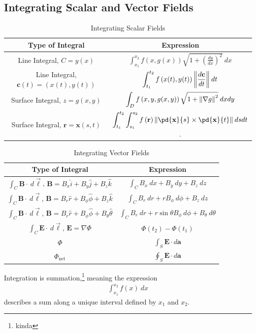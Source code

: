 \documentclass[10pt]{mypackage}
\begin{document}
\subsection{Integrating Scalar and Vector Fields}%
\begin{table}
  \centering
  \renewcommand{\arraystretch}{2.5}
  \begin{tabular}{c|c}
    Type of Integral & Expression\\
    \hline\hline
    Line Integral, $C = y(x)$ & $\displaystyle \int_{x_1}^{x_2} f\left(x,g(x)\right)\sqrt{1 + \left(\frac{dy}{dx}\right)^2}\:dx$\\
    Line Integral, $\mathbf{c}(t) = \left(x(t),y(t)\right)$ & $\displaystyle\int_{t_1}^{t_2}f\left(x(t),y(t)\right)\norm{\frac{d\mathbf{c}}{dt}}\:dt$\\
    \hline
    Surface Integral, $z = g(x,y)$ & $\displaystyle \int_{D}^{} f\left(x,y,g(x,y)\right)\sqrt{1 + \norm{\nabla g}^2}\:dxdy$\\
    Surface Integral, $\mathbf{r} = \mathbf{x} (s,t)$ & $\displaystyle \int_{t_1}^{t_2}\int_{s_1}^{s_2} f\left(\mathbf{r}\right)\norm{\pd{\mathbf{x}}{s}\times \pd{\mathbf{x}}{t}}\:dsdt$.
  \end{tabular}
  \caption{Integrating Scalar Fields}
\end{table}
\begin{table}
  \centering
  \renewcommand{\arraystretch}{2}
  \begin{tabular}{c|c}
    Type of Integral & Expression\\
    \hline\hline
    $\int_{C}^{} \mathbf{B}\cdot\:d\vec{\ell}$, $\mathbf{B} = B_x\widehat{i} + B_y\widehat{j} + B_z\widehat{k}$ & $\displaystyle \int_{C} B_x\:dx + B_y\:dy + B_z\:dz$\\
    $\int_{C}^{} \mathbf{B}\cdot\:d\vec{\ell}$, $\mathbf{B} = B_r\widehat{r} + B_{\phi}\widehat{\phi} + B_z\widehat{k}$ & $\displaystyle \int_{C} B_r\:dr + rB_{\phi}\:d\phi + B_z\:dz$\\
    $\int_{C}^{} \mathbf{B}\cdot\:d\vec{\ell}$, $\mathbf{B} = B_r\widehat{r} + B_{\phi}\widehat{\phi} + B_{\theta}\widehat{\theta}$ & $\displaystyle \int_{C} B_{r}\:dr + r\sin\theta B_{\phi}\:d\phi + B_{\theta}\:d\theta$\\
    $\int_{C}^{} \mathbf{E}\cdot\:d\vec{\ell}$, $\mathbf{E} = \nabla \Phi$ & $\displaystyle \Phi\left(t_2\right) - \Phi\left(t_1\right)$\\
    \hline
    $\Phi$ & $\displaystyle \int_{S}\mathbf{E}\cdot d\mathbf{a}$\\
    $\Phi_{\text{net}}$ & $\displaystyle \oint_{S}\mathbf{E}\cdot d\mathbf{a}$
  \end{tabular}
  \caption{Integrating Vector Fields}
\end{table}
Integration is summation,\footnote{kinda} meaning the expression
\begin{align*}
  \int_{x_1}^{x_2} f(x)\:dx
\end{align*}
describes a sum along a unique interval defined by $x_1$ and $x_2$.\newline
\end{document}
